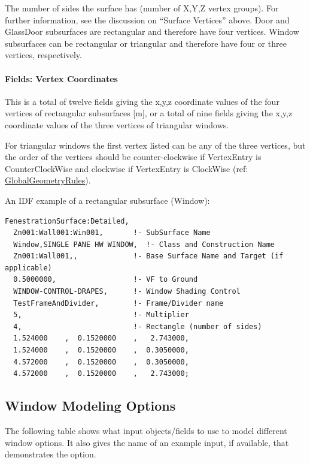 The number of sides the surface has (number of X,Y,Z vertex groups). For further information, see the discussion on ``Surface Vertices'' above. Door and GlassDoor subsurfaces are rectangular and therefore have four vertices. Window subsurfaces can be rectangular or triangular and therefore have four or three vertices, respectively.

\paragraph{Fields: Vertex Coordinates}\label{fields-vertex-coordinates}

This is a total of twelve fields giving the x,y,z coordinate values of the four vertices of rectangular subsurfaces {[}m{]}, or a total of nine fields giving the x,y,z coordinate values of the three vertices of triangular windows.

For triangular windows the first vertex listed can be any of the three vertices, but the order of the vertices should be counter-clockwise if VertexEntry is CounterClockWise and clockwise if VertexEntry is ClockWise (ref: \hyperref[globalgeometryrules]{GlobalGeometryRules}).

An IDF example of a rectangular subsurface (Window):

\begin{lstlisting}
FenestrationSurface:Detailed,
  Zn001:Wall001:Win001,       !- SubSurface Name
  Window,SINGLE PANE HW WINDOW,  !- Class and Construction Name
  Zn001:Wall001,,             !- Base Surface Name and Target (if applicable)
  0.5000000,                  !- VF to Ground
  WINDOW-CONTROL-DRAPES,      !- Window Shading Control
  TestFrameAndDivider,        !- Frame/Divider name
  5,                          !- Multiplier
  4,                          !- Rectangle (number of sides)
  1.524000    ,  0.1520000    ,   2.743000,
  1.524000    ,  0.1520000    ,  0.3050000,
  4.572000    ,  0.1520000    ,  0.3050000,
  4.572000    ,  0.1520000    ,   2.743000;
\end{lstlisting}

\subsection{Window Modeling Options}\label{window-modeling-options}

The following table shows what input objects/fields to use to model different window options. It also gives the name of an example input, if available, that demonstrates the option.

